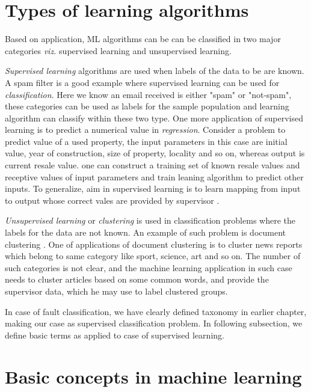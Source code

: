 \section{Types of learning algorithms}
\label{sec:secmltypes}
Based on application, ML algorithms can be can be classified in two major categories \emph{viz.} supervised learning and unsupervised learning. 

\emph{Supervised learning} algorithms are used when labels of the data to be are known. A spam filter is a good example where supervised learning can be used for \emph{classification}. Here we know an email received is either "spam" or "not-spam", these categories can be used as labels for the sample population and learning algorithm can classify within these two type.  One more application of supervised learning is to predict a numerical value in \emph{regression}. Consider a problem to predict value of a used property, the input parameters in this case are initial value, year of construction, size of property, locality and so on, whereas output is current resale value. one can construct a training set of known resale values and receptive values of input parameters and train leaning algorithm to predict other inputs. To generalize, aim in supervised learning is to learn mapping from input to output whose correct vales are provided by supervisor \cite{Alpaydin2004}.

\emph{Unsupervised learning} or \emph{clustering} is used in classification problems where the labels for the data are not known. An example of such problem is document clustering \cite{Alpaydin2004}. One of applications of document clustering is to cluster news reports which belong to same category like sport, science, art and so on. The number of such categories is not clear, and the machine learning application in such case needs to cluster articles based on some common words, and provide the supervisor data, which he may use to label clustered groups.

In case of fault classification, we have clearly defined taxonomy in earlier chapter, making our case as supervised classification problem. In following subsection, we define basic terms as applied to case of supervised learning.

\section{Basic concepts in machine learning}

